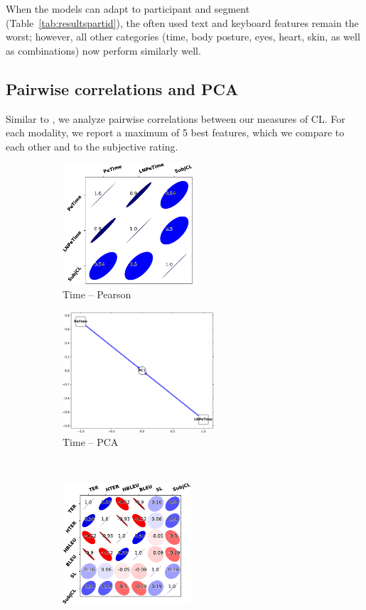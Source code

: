 \documentclass[output=paper]{langsci/langscibook}
\begin{document}
When the models can adapt to participant and segment (Table~\ref{tab:resultspartid}), the often used text and keyboard features remain the worst; however, all other categories (time, body posture, eyes, heart, skin, as well as combinations) now perform similarly well.

\subsection{Pairwise correlations and PCA}
Similar to \citet{vieira2016measures}, we analyze pairwise correlations between our measures of CL. For each modality, we report a maximum of 5 best features, which we compare to each other and to the subjective rating.

\begin{figure}
    \begin{subfigure}[b]{0.5\textwidth}\centering
        \includegraphics[height=4.5cm]{figures/time-pearson-cropped.pdf}
        \caption{Time -- Pearson}
    \end{subfigure}%
    \begin{subfigure}[b]{0.5\textwidth}\centering
        \includegraphics[height=4.5cm]{figures/time-PCA-cropped.pdf}
        \caption{Time -- PCA}
    \end{subfigure}\bigskip\\
    \begin{subfigure}[b]{0.5\textwidth}\centering
        \includegraphics[height=4.5cm]{figures/text-pearson-cropped.pdf}

\end{subfigure}
\end{figure}
\end{document}
